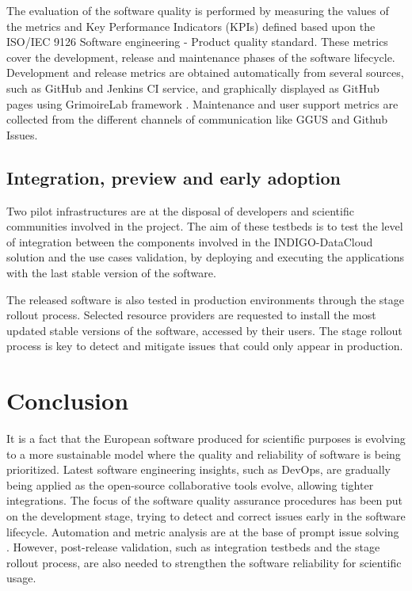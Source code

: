 \documentclass[journal]{IEEEtran}
\begin{document}
The evaluation of the software quality is performed by measuring the values of the metrics and Key Performance Indicators (KPIs) defined based upon the ISO/IEC 9126 Software engineering - Product quality standard. These metrics cover the development, release and maintenance phases of the software lifecycle. Development and release metrics are obtained automatically from several sources, such as GitHub and Jenkins CI service, and graphically displayed as GitHub pages using GrimoireLab framework \cite{grimoirelab}. Maintenance and user support metrics are collected from the different channels of communication like GGUS \cite{ggus} and Github Issues.

\subsection{Integration, preview and early adoption}

Two pilot infrastructures are at the disposal of developers and scientific communities involved in the project. The aim of these testbeds is to test the level of integration between the components involved in the INDIGO-DataCloud solution and the use cases validation, by deploying and executing the applications with the last stable version of the software.

The released software is also tested in production environments through the stage rollout process. Selected resource providers are requested to install the most updated stable versions of the software, accessed by their users. The stage rollout process is key to detect and mitigate issues that could only appear in production.

\section{Conclusion}

It is a fact that the European software produced for scientific purposes is evolving to a more sustainable model where the quality and reliability of software is being prioritized. Latest software engineering insights, such as DevOps, are gradually being applied as the open-source collaborative tools evolve, allowing tighter integrations. The focus of the software quality assurance procedures has been put on the development stage, trying to detect and correct issues early in the software lifecycle. Automation and metric analysis are at the base of prompt issue solving . However, post-release validation, such as integration testbeds and the stage rollout process, are also needed to strengthen the software reliability for scientific usage.
\end{document}
